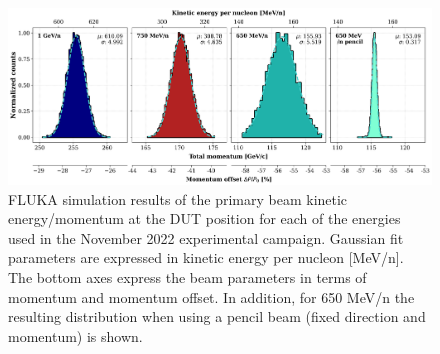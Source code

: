 \begin{figure}[t!]
    \centering
    \includegraphics[width=\textwidth]{images/Resulting_energies.png}
    \vspace*{-0.5cm}
    \caption{FLUKA simulation results of the primary beam kinetic energy/momentum at the DUT position for each of the energies used in the November 2022 experimental campaign. Gaussian fit parameters are expressed in kinetic energy per nucleon [MeV/n]. The bottom axes express the beam parameters in terms of momentum and momentum offset. In addition, for 650 MeV/n the resulting distribution when using a pencil beam (fixed direction and momentum) is shown.}
    \label{fig:straggling}
\end{figure}


